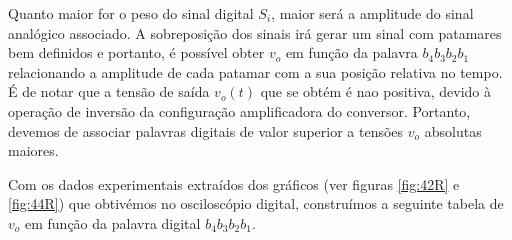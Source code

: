 \documentclass[a4paper,11pt]{report}
\begin{document}
Quanto maior for o peso do sinal digital $S_i$, maior será a amplitude do sinal analógico associado. A sobreposição dos sinais irá gerar um sinal com patamares bem definidos e portanto, é possível obter $v_o$ em função da palavra $b_4b_3b_2b_1$ relacionando a amplitude de cada patamar com a sua posição relativa no tempo. É de notar que a tensão de saída $v_o(t)$ que se obtém é nao positiva, devido à operação de inversão da configuração amplificadora do conversor. Portanto, devemos de associar palavras digitais de valor superior a tensões $v_o$ absolutas maiores. \\
\par



Com os dados experimentais extraídos dos gráficos (ver figuras \ref{fig:42R} e \ref{fig:44R}) que obtivémos no osciloscópio digital, construímos a seguinte tabela de $v_o$ em função da palavra digital $b_4b_3b_2b_1$.
\end{document}
